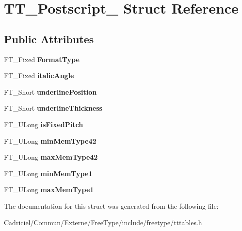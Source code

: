 \hypertarget{struct_t_t___postscript__}{}\section{T\+T\+\_\+\+Postscript\+\_\+ Struct Reference}
\label{struct_t_t___postscript__}
\subsection*{Public Attributes}
\begin{DoxyCompactItemize}
\item 
F\+T\+\_\+\+Fixed {\bfseries Format\+Type}\hypertarget{struct_t_t___postscript___a5ed6585c01fa4ffc3f8537d58bdd955f}{}\label{struct_t_t___postscript___a5ed6585c01fa4ffc3f8537d58bdd955f}

\item 
F\+T\+\_\+\+Fixed {\bfseries italic\+Angle}\hypertarget{struct_t_t___postscript___adcca36c7fbcbdff00fc8c2884a215830}{}\label{struct_t_t___postscript___adcca36c7fbcbdff00fc8c2884a215830}

\item 
F\+T\+\_\+\+Short {\bfseries underline\+Position}\hypertarget{struct_t_t___postscript___a909fd5064ab7547bb8ed984b5dfe2fe2}{}\label{struct_t_t___postscript___a909fd5064ab7547bb8ed984b5dfe2fe2}

\item 
F\+T\+\_\+\+Short {\bfseries underline\+Thickness}\hypertarget{struct_t_t___postscript___a4e4654766a4f27054c9a35958515e186}{}\label{struct_t_t___postscript___a4e4654766a4f27054c9a35958515e186}

\item 
F\+T\+\_\+\+U\+Long {\bfseries is\+Fixed\+Pitch}\hypertarget{struct_t_t___postscript___ab9a537994be4f81cb35f61f83cd97949}{}\label{struct_t_t___postscript___ab9a537994be4f81cb35f61f83cd97949}

\item 
F\+T\+\_\+\+U\+Long {\bfseries min\+Mem\+Type42}\hypertarget{struct_t_t___postscript___ad78af4931654c197d4a8d0f04d473885}{}\label{struct_t_t___postscript___ad78af4931654c197d4a8d0f04d473885}

\item 
F\+T\+\_\+\+U\+Long {\bfseries max\+Mem\+Type42}\hypertarget{struct_t_t___postscript___a70c4ba372d04e686208f0fede9885314}{}\label{struct_t_t___postscript___a70c4ba372d04e686208f0fede9885314}

\item 
F\+T\+\_\+\+U\+Long {\bfseries min\+Mem\+Type1}\hypertarget{struct_t_t___postscript___a91a8b40f60e67a1920209e6b08355848}{}\label{struct_t_t___postscript___a91a8b40f60e67a1920209e6b08355848}

\item 
F\+T\+\_\+\+U\+Long {\bfseries max\+Mem\+Type1}\hypertarget{struct_t_t___postscript___a944a3df5127262db0f7ae92868defb99}{}\label{struct_t_t___postscript___a944a3df5127262db0f7ae92868defb99}

\end{DoxyCompactItemize}


The documentation for this struct was generated from the following file\+:\begin{DoxyCompactItemize}
\item 
Cadriciel/\+Commun/\+Externe/\+Free\+Type/include/freetype/tttables.\+h\end{DoxyCompactItemize}
